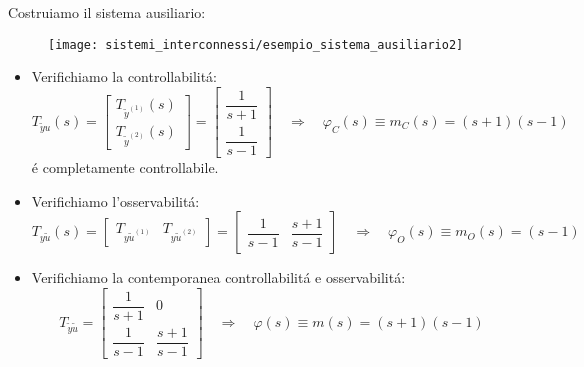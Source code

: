 \documentclass[../main.tex]{subfiles}
\begin{document}
			Costruiamo il sistema ausiliario:
			\begin{figure}[H]
				\centering\texttt{[image: sistemi\_interconnessi/esempio\_sistema\_ausiliario2]}
			\end{figure}
			\begin{itemize}
				\item 
					Verifichiamo la controllabilit\'a:
					\[
						T_{\tilde yu}(s) =
						\begin{bmatrix}
							T_{\tilde y^{(1)}}(s)\\
							T_{\tilde y^{(2)}}(s)
						\end{bmatrix} =
						\begin{bmatrix}
							\dfrac{1}{s+1}\\
							\dfrac{1}{s-1}
						\end{bmatrix}
						\quad\Rightarrow\quad
						\varphi_C(s) \equiv m_C(s) = (s+1)(s-1)
					\]
					\'e completamente controllabile.
				\item 
					Verifichiamo l'osservabilit\'a:
					\[
						T_{y \tilde u}(s) = 
						\begin{bmatrix}
							T_{y \tilde u^{(1)}} & T_{y \tilde u^{(2)}}
						\end{bmatrix} =
						\begin{bmatrix}
							\dfrac{1}{s-1} & \dfrac{s+1}{s-1}
						\end{bmatrix}
						\quad\Rightarrow\quad
						\varphi_O(s) \equiv m_O(s) = (s-1)
					\]
				\item 
					Verifichiamo la contemporanea controllabilit\'a e osservabilit\'a:
					\[
						T_{\tilde y \tilde u} =
						\begin{bmatrix}
							\dfrac{1}{s+1} & 0\\
							\dfrac{1}{s-1} & \dfrac{s+1}{s-1}
						\end{bmatrix}
						\quad\Rightarrow\quad
						\varphi(s) \equiv m(s) = (s+1)(s-1)
					\]
			\end{itemize}
		
\end{document}
